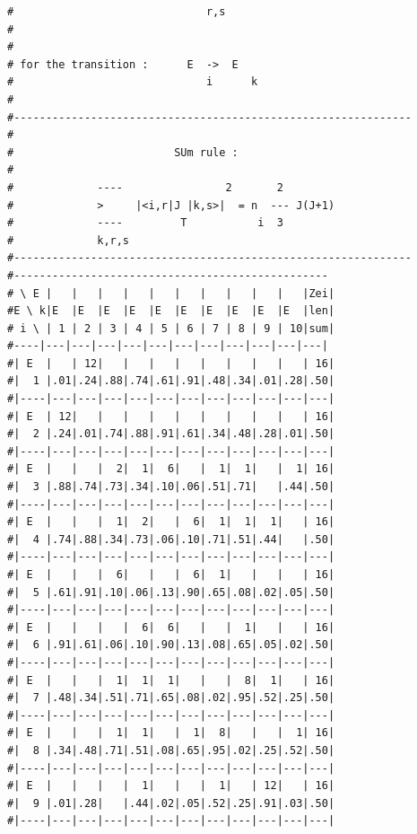 \begin{enumerate}
{\begin{verbatim}
#                              r,s                             
#                                                              
#                                                              
# for the transition :      E  ->  E                           
#                              i      k                        
#                                                              
#--------------------------------------------------------------
#                                                              
#                         SUm rule :                           
#                                                              
#             ----                2       2                    
#             >     |<i,r|J |k,s>|  = n  --- J(J+1)            
#             ----         T           i  3                    
#             k,r,s                                            
#-------------------------------------------------------------- 
#------------------------------------------------- 
# \ E |   |   |   |   |   |   |   |   |   |   |Zei|
#E \ k|E  |E  |E  |E  |E  |E  |E  |E  |E  |E  |len|
# i \ | 1 | 2 | 3 | 4 | 5 | 6 | 7 | 8 | 9 | 10|sum|
#----|---|---|---|---|---|---|---|---|---|---|---|
#| E  |   | 12|   |   |   |   |   |   |   |   | 16|
#|  1 |.01|.24|.88|.74|.61|.91|.48|.34|.01|.28|.50|
#|----|---|---|---|---|---|---|---|---|---|---|---|
#| E  | 12|   |   |   |   |   |   |   |   |   | 16|
#|  2 |.24|.01|.74|.88|.91|.61|.34|.48|.28|.01|.50|
#|----|---|---|---|---|---|---|---|---|---|---|---|
#| E  |   |   |  2|  1|  6|   |  1|  1|   |  1| 16|
#|  3 |.88|.74|.73|.34|.10|.06|.51|.71|   |.44|.50|
#|----|---|---|---|---|---|---|---|---|---|---|---|
#| E  |   |   |  1|  2|   |  6|  1|  1|  1|   | 16|
#|  4 |.74|.88|.34|.73|.06|.10|.71|.51|.44|   |.50|
#|----|---|---|---|---|---|---|---|---|---|---|---|
#| E  |   |   |  6|   |   |  6|  1|   |   |   | 16|
#|  5 |.61|.91|.10|.06|.13|.90|.65|.08|.02|.05|.50|
#|----|---|---|---|---|---|---|---|---|---|---|---|
#| E  |   |   |   |  6|  6|   |   |  1|   |   | 16|
#|  6 |.91|.61|.06|.10|.90|.13|.08|.65|.05|.02|.50|
#|----|---|---|---|---|---|---|---|---|---|---|---|
#| E  |   |   |  1|  1|  1|   |   |  8|  1|   | 16|
#|  7 |.48|.34|.51|.71|.65|.08|.02|.95|.52|.25|.50|
#|----|---|---|---|---|---|---|---|---|---|---|---|
#| E  |   |   |  1|  1|   |  1|  8|   |   |  1| 16|
#|  8 |.34|.48|.71|.51|.08|.65|.95|.02|.25|.52|.50|
#|----|---|---|---|---|---|---|---|---|---|---|---|
#| E  |   |   |   |  1|   |   |  1|   | 12|   | 16|
#|  9 |.01|.28|   |.44|.02|.05|.52|.25|.91|.03|.50|
#|----|---|---|---|---|---|---|---|---|---|---|---|

\end{verbatim}}
\end{enumerate}
